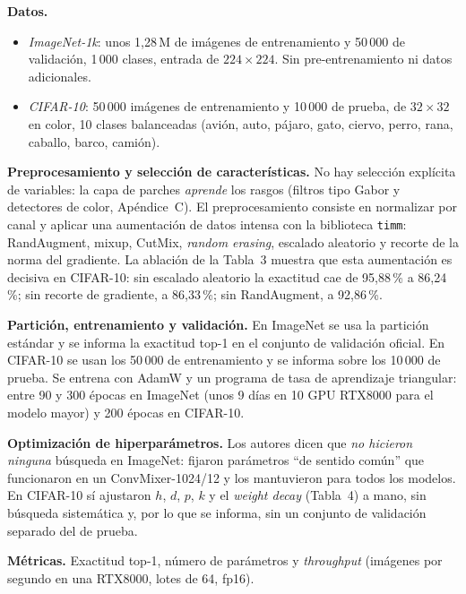 \documentclass[11pt,a4paper]{article}
\newcommand{\pct}[1]{#1\,\%}
\begin{document}
\textbf{Datos.}
\begin{itemize}
  \item \emph{ImageNet-1k}: unos 1,28\,M de imágenes de entrenamiento y 50\,000 de validación, 1\,000 clases,
  entrada de $224\times224$. Sin pre-entrenamiento ni datos adicionales.
  \item \emph{CIFAR-10}: 50\,000 imágenes de entrenamiento y 10\,000 de prueba, de $32\times32$ en color, 10 clases
  balanceadas (avión, auto, pájaro, gato, ciervo, perro, rana, caballo, barco, camión).
\end{itemize}

\textbf{Preprocesamiento y selección de características.} No hay selección explícita de variables: la capa de
parches \emph{aprende} los rasgos (filtros tipo Gabor y detectores de color, Apéndice~C). El preprocesamiento
consiste en normalizar por canal y aplicar una aumentación de datos intensa con la biblioteca \texttt{timm}:
RandAugment, mixup, CutMix, \emph{random erasing}, escalado aleatorio y recorte de la norma del gradiente. La
ablación de la Tabla~3 muestra que esta aumentación es decisiva en CIFAR-10: sin escalado aleatorio la exactitud
cae de \pct{95,88} a \pct{86,24}; sin recorte de gradiente, a \pct{86,33}; sin RandAugment, a \pct{92,86}.

\textbf{Partición, entrenamiento y validación.} En ImageNet se usa la partición estándar y se informa la
exactitud top-1 en el conjunto de validación oficial. En CIFAR-10 se usan los 50\,000 de entrenamiento y se informa
sobre los 10\,000 de prueba. Se entrena con AdamW \citep{adamw} y un programa de tasa de aprendizaje triangular: entre 90 y 300
épocas en ImageNet (unos 9 días en 10 GPU RTX8000 para el modelo mayor) y 200 épocas en CIFAR-10.

\textbf{Optimización de hiperparámetros.} Los autores dicen que \emph{no hicieron ninguna} búsqueda en ImageNet:
fijaron parámetros ``de sentido común'' que funcionaron en un ConvMixer-1024/12 y los mantuvieron para todos los
modelos. En CIFAR-10 sí ajustaron $h$, $d$, $p$, $k$ y el \emph{weight decay} (Tabla~4) a mano, sin búsqueda
sistemática y, por lo que se informa, sin un conjunto de validación separado del de prueba.

\textbf{Métricas.} Exactitud top-1, número de parámetros y \emph{throughput} (imágenes por segundo en una RTX8000,
lotes de 64, fp16).

\end{document}
